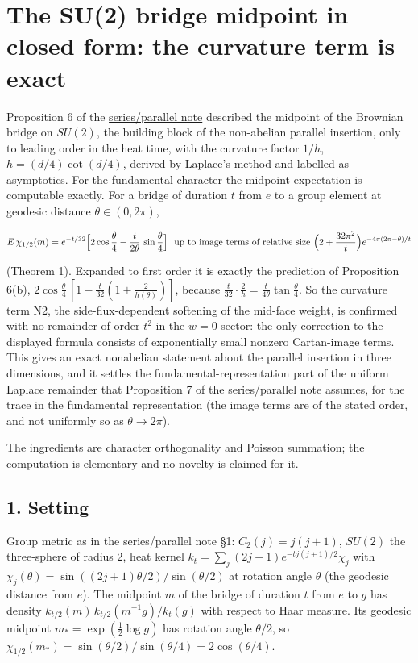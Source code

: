 \documentclass[11pt,a4paper]{article}
\begin{document}
\hypertarget{the-su2-bridge-midpoint-in-closed-form-the-curvature-term-is-exact}{%
\section{The SU(2) bridge midpoint in closed form: the curvature term is
exact}\label{the-su2-bridge-midpoint-in-closed-form-the-curvature-term-is-exact}}

Proposition 6 of the
\href{series-parallel-gauge-refinement.md}{series/parallel note}
described the midpoint of the Brownian bridge on \(SU(2)\), the building
block of the non-abelian parallel insertion, only to leading order in
the heat time, with the curvature factor \(1/h\), \(h=(d/4)\cot(d/4)\),
derived by Laplace's method and labelled as asymptotics. For the
fundamental character the midpoint expectation is computable exactly.
For a bridge of duration \(t\) from \(e\) to a group element at geodesic
distance \(\theta\in(0,2\pi)\),

\[E\,\chi_{1/2}(m)=e^{-t/32}\Bigl[2\cos\frac\theta4-\frac t{2\theta}\,
\sin\frac\theta4\Bigr]\ \ \text{up to image terms of relative size}\
\Bigl(2+\frac{32\pi^2}t\Bigr)e^{-4\pi(2\pi-\theta)/t}\]

(Theorem 1). Expanded to first order it is exactly the prediction of
Proposition 6(b),
\(2\cos\frac\theta4\,[1-\frac t{32}(1+\frac2{h(\theta)})]\), because
\(\frac t{32}\cdot\frac2h=\frac t{4\theta}\tan\frac\theta4\). So the
curvature term N2, the side-flux-dependent softening of the mid-face
weight, is confirmed with no remainder of order \(t^2\) in the \(w=0\)
sector: the only correction to the displayed formula consists of
exponentially small nonzero Cartan-image terms. This gives an exact
nonabelian statement about the parallel insertion in three dimensions,
and it settles the fundamental-representation part of the uniform
Laplace remainder that Proposition 7 of the series/parallel note
assumes, for the trace in the fundamental representation (the image
terms are of the stated order, and not uniformly so as
\(\theta\to2\pi\)).

The ingredients are character orthogonality and Poisson summation; the
computation is elementary and no novelty is claimed for it.

\hypertarget{setting}{%
\subsection{1. Setting}\label{setting}}

Group metric as in the series/parallel note §1: \(C_2(j)=j(j+1)\),
\(SU(2)\) the three-sphere of radius 2, heat kernel
\(k_t=\sum_j(2j+1)e^{-tj(j+1)/2}\chi_j\) with
\(\chi_j(\theta)=\sin((2j+1)\theta/2)/\sin(\theta/2)\) at rotation angle
\(\theta\) (the geodesic distance from \(e\)). The midpoint \(m\) of the
bridge of duration \(t\) from \(e\) to \(g\) has density
\(k_{t/2}(m)\,k_{t/2}(m^{-1}g)/k_t(g)\) with respect to Haar measure.
Its geodesic midpoint \(m_*=\exp(\frac12\log g)\) has rotation angle
\(\theta/2\), so
\(\chi_{1/2}(m_*)=\sin(\theta/2)/\sin(\theta/4)=2\cos(\theta/4)\).
\end{document}
